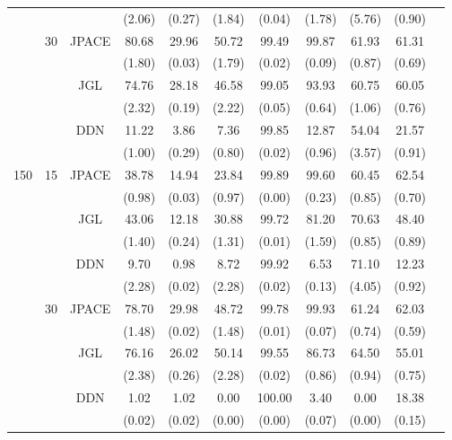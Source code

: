\documentclass[useAMS,usenatbib,referee]{bio}
\begin{document}
{\begin{table}[htb!]
{\begin{tabular}{||c|c|c||c|c|c|c|c|c|c||c}
 & & & (2.06) & (0.27) & (1.84) & (0.04) & (1.78) & (5.76) & (0.90) \\\cline{2-10} 
  &\multirow{6}{*}{30}  & \multirow{2}{*}{JPACE} &80.68 & 29.96 & 50.72 & 99.49 & 99.87 & 61.93 & 61.31 \\ 
& & & (1.80) & (0.03) & (1.79) & (0.02) & (0.09) & (0.87) & (0.69) \\ \cline{3-10} 
& & \multirow{2}{*}{JGL} & 74.76 & 28.18 & 46.58 & 99.05 & 93.93 & 60.75 & 60.05 \\ 
 & & & (2.32) & (0.19) & (2.22) & (0.05) & (0.64) & (1.06) & (0.76) \\ \cline{3-10} 
& & \multirow{2}{*}{DDN} & 11.22 & 3.86 & 7.36 & 99.85 & 12.87 & 54.04 & 21.57 \\ 
 & & & (1.00) & (0.29) & (0.80) & (0.02) & (0.96) & (3.57) & (0.91) \\\cline{1-10} 
\multirow{12}{*}{150}  &\multirow{6}{*}{15}  & \multirow{2}{*}{JPACE} &38.78 & 14.94 & 23.84 & 99.89 & 99.60 & 60.45 & 62.54 \\ 
& & & (0.98) & (0.03) & (0.97) & (0.00) & (0.23) & (0.85) & (0.70) \\ \cline{3-10} 
& & \multirow{2}{*}{JGL} & 43.06 & 12.18 & 30.88 & 99.72 & 81.20 & 70.63 & 48.40 \\ 
 & & & (1.40) & (0.24) & (1.31) & (0.01) & (1.59) & (0.85) & (0.89) \\ \cline{3-10} 
& & \multirow{2}{*}{DDN} & 9.70 & 0.98 & 8.72 & 99.92 & 6.53 & 71.10 & 12.23 \\ 
 & & & (2.28) & (0.02) & (2.28) & (0.02) & (0.13) & (4.05) & (0.92) \\\cline{2-10} 
  &\multirow{6}{*}{30}  & \multirow{2}{*}{JPACE} &78.70 & 29.98 & 48.72 & 99.78 & 99.93 & 61.24 & 62.03 \\ 
& & & (1.48) & (0.02) & (1.48) & (0.01) & (0.07) & (0.74) & (0.59) \\ \cline{3-10} 
& & \multirow{2}{*}{JGL} & 76.16 & 26.02 & 50.14 & 99.55 & 86.73 & 64.50 & 55.01 \\ 
 & & & (2.38) & (0.26) & (2.28) & (0.02) & (0.86) & (0.94) & (0.75) \\ \cline{3-10} 
& & \multirow{2}{*}{DDN} & 1.02 & 1.02 & 0.00 & 100.00 & 3.40 & 0.00 & 18.38 \\ 
 & & & (0.02) & (0.02) & (0.00) & (0.00) & (0.07) & (0.00) & (0.15) \\\cline{1-10} 
\end{tabular}
}
\end{table}




}
\end{document}
